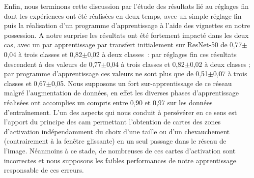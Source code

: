 Enfin, nous terminons cette discussion par l'étude des résultats lié au réglages fin dont les expériences ont été réalisées en deux temps, avec un simple réglage fin puis la réalisation d'un programme d'apprentissage à l'aide des vignettes en notre possession. A notre surprise les résultats ont été fortement impacté dans les deux cas, avec un \fscore{} par apprentissage par transfert initialement sur ResNet-50 de 0,77$\pm$0,04 à trois classes et 0,82$\pm$0,02 à deux classes~: par réglages fin ces résultats descendent à des valeurs de 0,77$\pm$0,04 à trois classes et 0,82$\pm$0,02 à deux classes ; par programme d'apprentissage ces valeurs ne sont plus que de 0,51$\pm$0,07 à trois classes et 0,67$\pm$0,05. Nous supposons un fort sur-apprentissage de ce réseau malgré l'augmentation de données, en effet les diverses phases d'apprentissage réalisées ont accomplies un \fscore{} compris entre 0,90 et 0,97 sur les données d'entraînement. L'un des aspects qui nous conduit à persévérer en ce sens est l'apport du principe des \gls{cam} permettant l'obtention de cartes des zones d'activation indépendamment du choix d'une taille ou d'un chevauchement (contrairement à la fenêtre glissante) en un seul passage dans le réseau de l'image. Néanmoins à ce stade, de nombreuses de ces cartes d'activation sont incorrectes et nous supposons les faibles performances de notre apprentissage responsable de ces erreurs.\par